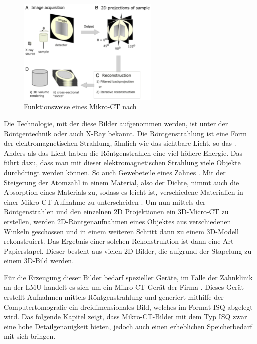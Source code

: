 \begin{figure}[h]
	\centering
	\includegraphics[width=0.6\textwidth]{img/Funktion_CT.png}
	\caption{Funktionsweise eines Mikro-CT nach \citet[S.~16]{pult2021}}
	\label{fig:spectrum}
\end{figure}

Die Technologie, mit der diese Bilder aufgenommen werden, ist unter der Röntgentechnik
oder auch \ac{X-Ray} bekannt. Die Röntgenstrahlung ist eine Form der elektromagnetischen
Strahlung, ähnlich wie das sichtbare Licht, so das \citet[K.~1]{nib2024}. Anders
als das Licht haben die Röntgenstrahlen eine viel höhere Energie. Das führt dazu,
dass man mit dieser elektromagnetischen Strahlung viele Objekte durchdringt werden
können. So auch Gewebeteile eines Zahnes \citep[vgl.][K.~1]{nib2024}. Mit der
Steigerung der Atomzahl in einem Material, also der Dichte, nimmt auch die
Absorption eines Materials zu, sodass es leicht ist, verschiedene Materialien in
einer Mikro-\ac{CT}-Aufnahme zu unterscheiden \citep[vgl.][K.~1]{nib2024}. Um nun
mittels der Röntgenstrahlen und den einzelnen \ac{2D} Projektionen ein \ac{3D}-Micro-\ac{CT}
zu erstellen, werden 2D-Röntgenaufnahmen eines Objektes aus verschiedenen Winkeln
geschossen und in einem weiteren Schritt dann zu einem \ac{3D}-Modell
rekonstruiert. Das Ergebnis einer solchen Rekonstruktion ist dann eine Art Papierstapel.
Dieser besteht aus vielen 2D-Bilder, die aufgrund der Stapelung zu einem \ac{3D}-Bild
werden.

Für die Erzeugung dieser Bilder bedarf spezieller Geräte, im Falle der Zahnklinik
an der \ac{LMU} handelt es sich um ein Mikro-\ac{CT}-Gerät der Firma \citet{scanco2024}.
Dieses Gerät erstellt Aufnahmen mittels Röntgenstrahlung und generiert mithilfe der
Computertomografie ein dreidimensionales Bild, welches im Format \ac{ISQ} abgelegt
wird. Das folgende Kapitel zeigt, dass Mikro-\ac{CT}-Bilder mit dem Typ \ac{ISQ}
zwar eine hohe Detailgenauigkeit bieten, jedoch auch einen erheblichen
Speicherbedarf mit sich bringen.

